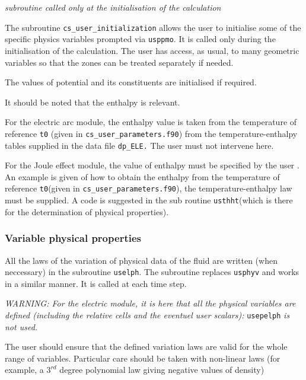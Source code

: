 {{\noindent
\textit{subroutine called only at the initialisation of the calculation}

The subroutine \texttt{cs\_user\_initialization} allows the user to initialise some of the specific physics variables prompted via \texttt{usppmo}. It is called only during the initialisation of the calculation. The user has access, as usual, to many geometric variables so
 that the zones can be treated separately if needed.

The values of potential and its constituents are initialised if required.

It should be noted that the enthalpy is relevant.

\begin{list}{-}{}
\item For the electric arc module, the enthalpy value is taken from the temperature
 of reference \texttt{t0} (given in \texttt{cs\_user\_parameters.f90}) from the temperature-enthalpy
 tables
 supplied in the data file \texttt{dp\_ELE.} The user must not intervene here.
\item For the Joule effect module, the value of enthalpy must be specified by the user
. An example is given of how to obtain the enthalpy from the temperature of reference
 \texttt{t0}(given in \texttt{cs\_user\_parameters.f90}), the temperature-enthalpy law must be
supplied. A code is suggested in the sub routine \texttt{usthht}(which is there for
 the determination of physical properties).
\end{list}

\subsubsection{Variable physical properties}

All the laws of the variation of physical data of the fluid are written (when neccessary)
in the subroutine \texttt{uselph}. The subroutine replaces \texttt{usphyv} and works
 in a similar manner. It is called at each time step.

{\em WARNING: For the electric module, it is here that all the physical variables are defined
 (including the relative cells and the eventuel user scalars):} \texttt{usepelph} {\em {is not used.}}

The user should ensure that the defined variation laws are valid for the whole range of
variables. Particular care should be taken with non-linear laws (for example, a
 $3^{rd}$ degree polynomial law giving negative values of density)

}}
